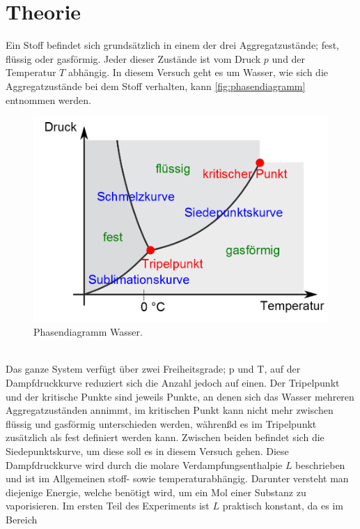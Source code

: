 \section{Theorie}
\label{sec:Theorie}

Ein Stoff befindet sich grundsätzlich in einem der drei Aggregatzustände;
fest, flüssig oder gasförmig. Jeder dieser Zustände ist vom Druck $p$ und
der Temperatur $T$ abhängig. In diesem Versuch geht es um Wasser, wie sich 
die Aggregatzustände bei dem Stoff verhalten, kann \autoref{fig:phasendiagramm}
entnommen werden. 
\begin{figure}[h]
    \centering
        \centering
        \includegraphics[width=\textwidth]{Bilder/aggregatzustand.png}
        \caption{Phasendiagramm Wasser. \cite{phasendiagramm}}
    \hfill
    \label{fig:phasendiagramm}
\end{figure}
\\
Das ganze System verfügt über zwei Freiheitsgrade; p und T, auf der 
Dampfdruckkurve reduziert sich die Anzahl jedoch auf einen.
Der Tripelpunkt und der kritische Punkte sind jeweils Punkte, an denen sich das 
Wasser mehreren Aggregatzuständen annimmt, im kritischen Punkt kann nicht mehr zwischen
flüssig und gasförmig unterschieden werden, währenßd es im Tripelpunkt zusätzlich als fest 
definiert werden kann. Zwischen beiden befindet sich die Siedepunktskurve, um 
diese soll es in diesem Versuch gehen. Diese Dampfdruckkurve wird durch die 
molare Verdampfungsenthalpie $L$ beschrieben und ist im Allgemeinen stoff-
sowie temperaturabhängig. Darunter versteht man diejenige Energie, welche
benötigt wird, um ein Mol einer Substanz zu vaporisieren.
Im ersten Teil des Experiments ist $L$ praktisch konstant, da es im Bereich 
